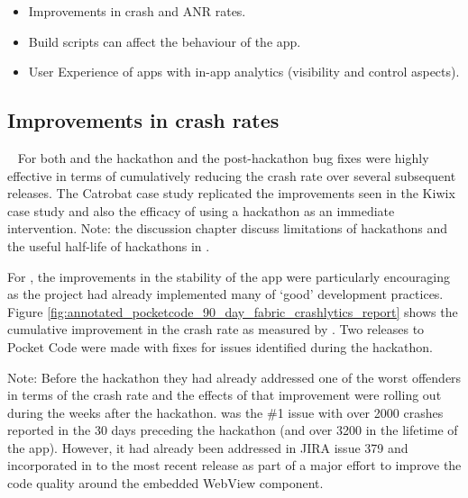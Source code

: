 \begin{itemize}
    \itemsep0em
    \item Improvements in crash and ANR rates.
    \item Build scripts can affect the behaviour of the app.
    \item User Experience of apps with in-app analytics (visibility and control aspects).
\end{itemize}

\subsection{Improvements in crash rates}~\label{aata-improvements-in-crash-rates-topic}
For both  and  the hackathon and the post-hackathon bug fixes were highly effective in terms of cumulatively reducing the crash rate over several subsequent releases. %
The Catrobat case study replicated the improvements seen in the Kiwix case study and also the efficacy of using a hackathon as an immediate intervention. Note: the discussion chapter discuss limitations of hackathons and the useful half-life of hackathons in . 


For , the improvements in the stability of the app were particularly encouraging as the project had already implemented many of `good' development practices. Figure \ref{fig:annotated_pocketcode_90_day_fabric_crashlytics_report} shows the cumulative improvement in the crash rate as measured by . Two releases to Pocket Code were made with fixes for issues identified during the hackathon.

Note: Before the hackathon they had already addressed one of the worst offenders in terms of the crash rate and the effects of that improvement were rolling out during the weeks after the hackathon.
 was the \#1 issue with over 2000 crashes reported in the 30 days preceding the hackathon (and over 3200 in the lifetime of the app). However, it had already been addressed in JIRA issue 379 and incorporated in to the most recent release  as part of a major effort to improve the code quality around the embedded WebView component.


